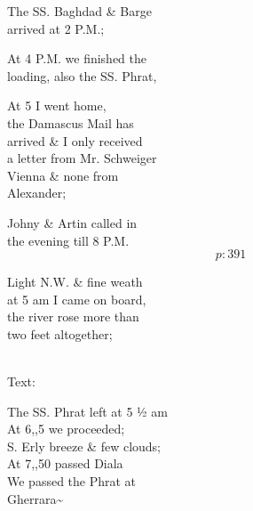 \documentclass{report}
\begin{document}
	\par{
 	The SS. Baghdad \& Barge\ \\arrived at 2 P.M.;\ \\
	}

	\par{
 	At 4 P.M. we finished the\ \\loading, also the SS. Phrat,\ \\
	}

	\par{
 	At 5 I went home,\ \\the Damascus Mail has\ \\arrived \& I only received\ \\a letter from Mr. Schweiger\ \\Vienna \& none from\ \\Alexander;\ \\
	}

	\par{
 	Johny \& Artin called in\ \\the evening till 8 P.M.\ \\
  \[p: 391 \]

	}





	\par{
 	Light N.W. \& fine weath\ \\at 5 am I came on board,\ \\the river rose more than\ \\two feet altogether;\ \\\ \\
	}

	\par{
 	Text:\ \\
	}

	\par{
 	The SS. Phrat left at 5 ½ am\ \\At 6,,5 we proceeded;\ \\S. Erly breeze \& few clouds;\ \\At 7,,50 passed Diala\ \\We passed the Phrat at\ \\Gherrara\~{}\ \\
	}
\end{document}
